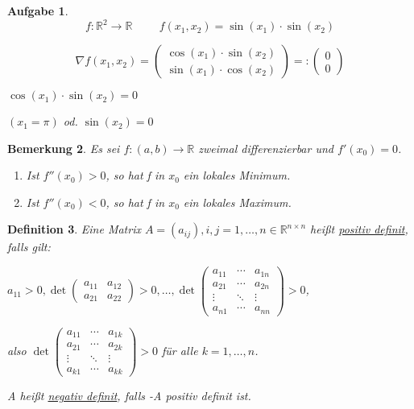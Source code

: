 \documentclass[fontset=ubuntu,12pt,a4paper]{scrreprt}
\newtheorem{defi}{Definition}[section]
\newtheorem{bemerkung}[defi]{Bemerkung}
\newtheorem{aufg}[defi]{Aufgabe}
\begin{document}
\begin{aufg}
    \[f:\mathbb{R}^2\to\mathbb{R}\hspace{1cm}f(x_1,x_2)=\sin(x_1)\cdot\sin(x_2)\]

    \[\nabla f(x_1,x_2)=\begin{pmatrix}
        \cos(x_1)\cdot\sin(x_2) \\
        \sin(x_1)\cdot\cos(x_2)
    \end{pmatrix} =: \begin{pmatrix}0 \\ 0\end{pmatrix}\]

        \(\cos(x_1)\cdot\sin(x_2)=0\)

        \((x_1=\pi)\) od. \(\sin(x_2)=0\)
\end{aufg}

\begin{bemerkung}
    Es sei \(f:(a,b)\to\mathbb{R}\) zweimal differenzierbar und \(f'(x_0)=0\).
    \begin{enumerate}[label=\emph{(\roman*)}]
        \item Ist \(f''(x_0)>0\), so hat f in \(x_0\) ein lokales Minimum.
        \item Ist \(f''(x_0)<0\), so hat f in \(x_0\) ein lokales Maximum.
    \end{enumerate}
\end{bemerkung}

\begin{defi}
    Eine Matrix \(A=(a_{ij}), i,j=1,\dots,n \in \mathbb{R}^{n\times n}\) heißt \underline{positiv definit}, falls gilt:


    \(a_{11}>0,\det\begin{pmatrix}
    a_{11} & a_{12} \\ a_{21} & a_{22}
    \end{pmatrix} > 0, \dots, \det\begin{pmatrix}
    a_{11} & \cdots & a_{1n} \\
    a_{21} & \cdots & a_{2n} \\
    \vdots & \ddots & \vdots \\
    a_{n1} & \cdots & a_{nn}
    \end{pmatrix} > 0\), 
    
    also \(\det\begin{pmatrix}
    a_{11} & \cdots & a_{1k} \\
    a_{21} & \cdots & a_{2k} \\
    \vdots & \ddots & \vdots \\
    a_{k1} & \cdots & a_{kk}
    \end{pmatrix} > 0\) für alle \(k=1,\dots,n\).
    
    A heißt \underline{negativ definit}, falls -A positiv definit ist.
\end{defi}
\end{document}
